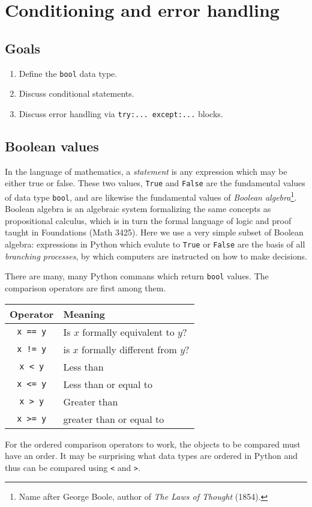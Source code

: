 \documentclass[m3380-lec-main.tex]{subfiles}
\begin{document}
\chapter{Conditioning and error handling}

\section*{Goals}
\begin{enumerate}[1.~]\setlength{\itemsep}{0pt}
\item Define the \verb|bool| data type.
\item Discuss conditional statements.
\item Discuss error handling via \verb|try:... except:...| blocks.
\end{enumerate}

\section{Boolean values}
In the language of mathematics, a \emph{statement} is any expression which may be either true or false. These two values, \verb|True| and \verb|False| are the fundamental values of data type \verb|bool|, and are likewise the fundamental values of \emph{Boolean algebra}\footnote{Name after George Boole, author of \emph{The Laws of Thought} (1854).}. Boolean algebra is an algebraic system formalizing the same concepts as propositional calculus, which is in turn the formal language of logic and proof taught in Foundations (Math 3425). Here we use a very simple subset of Boolean algebra: expressions in Python which evalute to \verb|True| or \verb|False| are the basis of all \emph{branching processes}, by which computers are instructed on how to make decisions.

There are many, many Python commans which return \verb|bool| values. The comparison operators are first among them.
\begin{center}
\begin{tabular}{c|l}
\textbf{Operator} & \textbf{Meaning} \\ \hline
\verb|x == y| & Is $x$ formally equivalent to $y$? \\
\verb|x != y| & is $x$ formally different from $y$? \\
\verb|x < y| & Less than \\
\verb|x <= y| & Less than or equal to \\
\verb|x > y| & Greater than \\
\verb|x >= y| & greater than or equal to
\end{tabular}\end{center}
For the ordered comparison operators to work, the objects to be compared must have an order. It may be surprising what data types are ordered in Python and thus can be compared using \verb|<| and \verb|>|.
\end{document}
